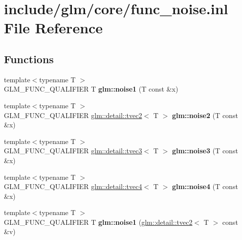 \hypertarget{func__noise_8inl}{\section{include/glm/core/func\-\_\-noise.inl \-File \-Reference}
\label{func__noise_8inl}
}
\subsection*{\-Functions}
\begin{DoxyCompactItemize}
\item 
\hypertarget{namespaceglm_a46b13094895146ed855baa444f5b13a2}{{\footnotesize template$<$typename T $>$ }\\\-G\-L\-M\-\_\-\-F\-U\-N\-C\-\_\-\-Q\-U\-A\-L\-I\-F\-I\-E\-R \-T {\bfseries glm\-::noise1} (\-T const \&x)}\label{namespaceglm_a46b13094895146ed855baa444f5b13a2}

\item 
\hypertarget{namespaceglm_a537b52cd11e23488fdb340b14e230d6a}{{\footnotesize template$<$typename T $>$ }\\\-G\-L\-M\-\_\-\-F\-U\-N\-C\-\_\-\-Q\-U\-A\-L\-I\-F\-I\-E\-R \*
\hyperlink{structglm_1_1detail_1_1tvec2}{glm\-::detail\-::tvec2}$<$ \-T $>$ {\bfseries glm\-::noise2} (\-T const \&x)}\label{namespaceglm_a537b52cd11e23488fdb340b14e230d6a}

\item 
\hypertarget{namespaceglm_a93f45a95a1a28541fd1bc7eca43861dd}{{\footnotesize template$<$typename T $>$ }\\\-G\-L\-M\-\_\-\-F\-U\-N\-C\-\_\-\-Q\-U\-A\-L\-I\-F\-I\-E\-R \*
\hyperlink{structglm_1_1detail_1_1tvec3}{glm\-::detail\-::tvec3}$<$ \-T $>$ {\bfseries glm\-::noise3} (\-T const \&x)}\label{namespaceglm_a93f45a95a1a28541fd1bc7eca43861dd}

\item 
\hypertarget{namespaceglm_aaa8ec09066d07f381c26788fa673d1c5}{{\footnotesize template$<$typename T $>$ }\\\-G\-L\-M\-\_\-\-F\-U\-N\-C\-\_\-\-Q\-U\-A\-L\-I\-F\-I\-E\-R \*
\hyperlink{structglm_1_1detail_1_1tvec4}{glm\-::detail\-::tvec4}$<$ \-T $>$ {\bfseries glm\-::noise4} (\-T const \&x)}\label{namespaceglm_aaa8ec09066d07f381c26788fa673d1c5}

\item 
\hypertarget{namespaceglm_ab95a02ef03c4ecae418d18841046aebb}{{\footnotesize template$<$typename T $>$ }\\\-G\-L\-M\-\_\-\-F\-U\-N\-C\-\_\-\-Q\-U\-A\-L\-I\-F\-I\-E\-R \-T {\bfseries glm\-::noise1} (\hyperlink{structglm_1_1detail_1_1tvec2}{glm\-::detail\-::tvec2}$<$ \-T $>$ const \&v)}\label{namespaceglm_ab95a02ef03c4ecae418d18841046aebb}


\end{DoxyCompactItemize}
